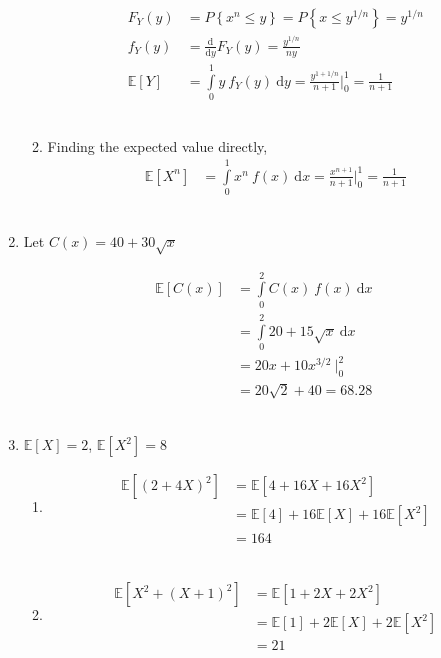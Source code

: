 \begin{enumerate}
\begin{enumerate}
			\begin{align}
				F_Y (y) &= P \left\{x^n \leq y\right\} = P \left\{x \leq y^{1/n}\right\} = y^{1/n} \\
				f_Y (y)&= \frac{\mathrm{d}}{\mathrm{d} y} F_Y (y) = \frac{y^{1/n}}{ny} \\
				\mathbb{E}[Y] &= \int\limits_{0}^{1} y\ f_Y (y)\ \mathrm{d}y = \frac{y^{1 + 1/n}}{n + 1} \Big|_0^1 = \frac{1}{n+1}
			\end{align} \\
			\item Finding the expected value directly,\\
			\begin{align}
				\mathbb{E}[X^n] &= \int\limits_{0}^{1} x^n\ f(x)\ \mathrm{d}x = \frac{x^{n+1}}{n+1} \Big|_0^1 = \frac{1}{n+1}
			\end{align} \\
			
		\end{enumerate}
	
	
	\item Let $ C(x) = 40 + 30 \sqrt{x} $
	
		\begin{align}
			\mathbb{E}[C(x)] &= \int\limits_{0}^{2} C(x)\ f(x)\ \mathrm{d}x \nonumber \\
			&= \int\limits_{0}^{2} 20 + 15 \sqrt{x}\ \mathrm{d}x \nonumber \\
			&= 20x + 10 x^{3/2} \ \Big|_0^2 \nonumber \\
			&= 20\sqrt{2} + 40 = 68.28
		\end{align} \\
	
	
	\item $ \mathbb{E}[X] = 2 $, $ \mathbb{E}[X^2] = 8 $ \\
	
		\begin{enumerate}
			
			\item \begin{align}
				\mathbb{E}[(2 + 4X)^2] &= \mathbb{E}[4 + 16X + 16X^2] \nonumber \\
				&= \mathbb{E}[4] + 16\mathbb{E}[X] + 16 \mathbb{E}[X^2] \nonumber \\
				&= 164
			\end{align} \\
			
			\item \begin{align}
				\mathbb{E}[X^2 + (X + 1)^2] &= \mathbb{E}[1 + 2X + 2X^2] \nonumber \\
				&= \mathbb{E}[1] + 2 \mathbb{E}[X] + 2 \mathbb{E}[X^2] \nonumber \\
				&= 21
			\end{align} \\
			

\end{enumerate}
\end{enumerate}
